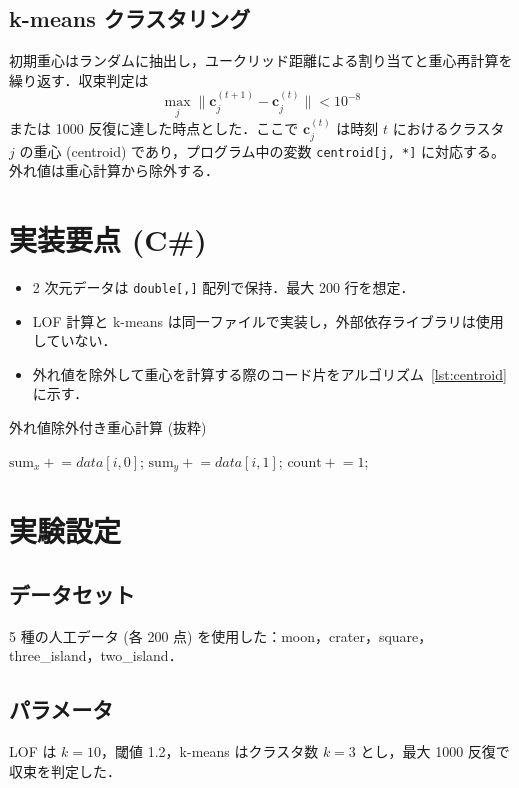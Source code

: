 \documentclass[a4j,dvipdfmx]{jsarticle}
\begin{document}
\subsection{k-means クラスタリング}
初期重心はランダムに抽出し，ユークリッド距離による割り当てと重心再計算を繰り返す．収束判定は
\[
  \max_{j} \bigl\| \mathbf{c}_{j}^{(t+1)} - \mathbf{c}_{j}^{(t)} \bigr\| < 10^{-8}
\]
または 1000 反復に達した時点とした．ここで $\mathbf{c}_{j}^{(t)}$ は時刻 $t$ におけるクラスタ $j$ の重心 (centroid) であり，プログラム中の変数 \texttt{centroid[j, *]} に対応する。外れ値は重心計算から除外する．

\section{実装要点 (C\#)}
\begin{itemize}
  \item 2 次元データは \texttt{double[,]} 配列で保持．最大 200 行を想定．
  \item LOF 計算と k-means は同一ファイルで実装し，外部依存ライブラリは使用していない．
  \item 外れ値を除外して重心を計算する際のコード片をアルゴリズム~\ref{lst:centroid} に示す．
\end{itemize}

\begin{algorithm}[tbp]
\caption{外れ値除外付き重心計算 (抜粋)}
\label{lst:centroid}
\begin{algorithmic}[1]
    \STATE $\text{sum}_x \mathrel{+}= data[i,0]$;
    \STATE $\text{sum}_y \mathrel{+}= data[i,1]$;
    \STATE $\text{count} \mathrel{+}=1$;
  \ENDIF
\ENDFOR
\end{algorithmic}
\end{algorithm}

\section{実験設定}
\subsection{データセット}
5 種の人工データ (各 200 点) を使用した：moon，crater，square，three\_island，two\_island．

\subsection{パラメータ}
LOF は $k=10$，閾値 1.2，k-means はクラスタ数 $k=3$ とし，最大 1000 反復で収束を判定した．
\end{document}
